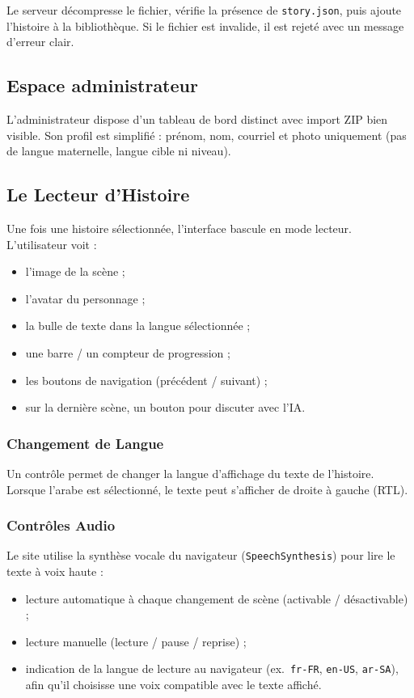 \documentclass[12pt,twoside,letterpaper]{article}
\begin{document}
Le serveur d\'ecompresse le fichier, v\'erifie la pr\'esence de \texttt{story.json},
puis ajoute l'histoire \`a la biblioth\`eque.
Si le fichier est invalide, il est rejet\'e avec un message d'erreur clair.

\subsection{Espace administrateur}

L'administrateur dispose d'un tableau de bord distinct avec import ZIP bien visible.
Son profil est simplifi\'e : pr\'enom, nom, courriel et photo uniquement
(pas de langue maternelle, langue cible ni niveau).

\subsection{Le Lecteur d'Histoire}

Une fois une histoire s\'electionn\'ee, l'interface bascule en mode lecteur.
L'utilisateur voit :
\begin{itemize}[leftmargin=*]
  \item l'image de la sc\`ene ;
  \item l'avatar du personnage ;
  \item la bulle de texte dans la langue s\'electionn\'ee ;
  \item une barre / un compteur de progression ;
  \item les boutons de navigation (pr\'ec\'edent / suivant) ;
  \item sur la derni\`ere sc\`ene, un bouton pour discuter avec l'IA.
\end{itemize}

\subsubsection{Changement de Langue}
Un contr\^ole permet de changer la langue d'affichage du texte de l'histoire.
Lorsque l'arabe est s\'electionn\'e, le texte peut s'afficher de droite \`a gauche (RTL).

\subsubsection{Contr\^oles Audio}
Le site utilise la synth\`ese vocale du navigateur (\texttt{SpeechSynthesis})
pour lire le texte \`a voix haute :
\begin{itemize}[leftmargin=*]
  \item lecture automatique \`a chaque changement de sc\`ene (activable / d\'esactivable) ;
  \item lecture manuelle (lecture / pause / reprise) ;
  \item indication de la langue de lecture au navigateur
  (ex.\ \texttt{fr-FR}, \texttt{en-US}, \texttt{ar-SA}),
  afin qu'il choisisse une voix compatible avec le texte affich\'e.
\end{itemize}
\end{document}
